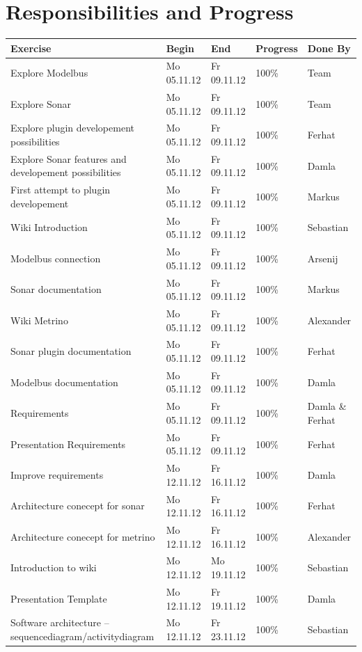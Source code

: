 \section{Responsibilities and Progress}
\setlength{\LTleft}{-0.5cm} 
\begin{longtable}{|p{6cm}|p{2.5cm}|p{2.5cm}|p{1.7cm}|p{1.8cm}|} \hline
\textbf{Exercise} & \textbf{Begin} & \textbf{End} & \textbf{Progress} & \textbf{Done By} \\ \hline
Explore Modelbus & Mo 05.11.12 & Fr 09.11.12 & 100\% & Team \\
Explore Sonar & Mo 05.11.12 & Fr 09.11.12 & 100\% & Team \\ 
Explore plugin developement possibilities & Mo 05.11.12 & Fr 09.11.12 & 100\% & Ferhat \\ 
Explore Sonar features and developement possibilities & Mo 05.11.12 & Fr 09.11.12 & 100\% & Damla \\ 
First attempt to plugin developement & Mo 05.11.12 & Fr 09.11.12 & 100\% & Markus \\ 
Wiki Introduction & Mo 05.11.12 & Fr 09.11.12 & 100\% & Sebastian \\ 
Modelbus connection & Mo 05.11.12 & Fr 09.11.12 & 100\% & Arsenij \\ 
Sonar documentation & Mo 05.11.12 & Fr 09.11.12 & 100\% & Markus \\ 
Wiki Metrino & Mo 05.11.12 & Fr 09.11.12 & 100\% & Alexander \\ 
Sonar plugin documentation & Mo 05.11.12 & Fr 09.11.12 & 100\% & Ferhat \\ 
Modelbus documentation & Mo 05.11.12 & Fr 09.11.12 & 100\% & Damla \\ 
Requirements & Mo 05.11.12 & Fr 09.11.12 & 100\% & Damla \& Ferhat \\ 
Presentation Requirements & Mo 05.11.12 & Fr 09.11.12 & 100\% & Ferhat \\ 
Improve requirements & Mo 12.11.12 & Fr 16.11.12 & 100\% & Damla \\
Architecture conecept for sonar & Mo 12.11.12 & Fr 16.11.12 & 100\% & Ferhat \\ 
Architecture conecept for metrino & Mo 12.11.12 & Fr 16.11.12 & 100\% & Alexander \\ 
Introduction to wiki & Mo 12.11.12 & Mo 19.11.12 & 100\% & Sebastian \\ 
Presentation Template & Mo 12.11.12 & Fr 19.11.12 & 100\% & Damla \\ 
Software architecture – sequencediagram/activitydiagram & Mo 12.11.12 & Fr 23.11.12 & 100\% & Sebastian \\ 

\end{longtable}
